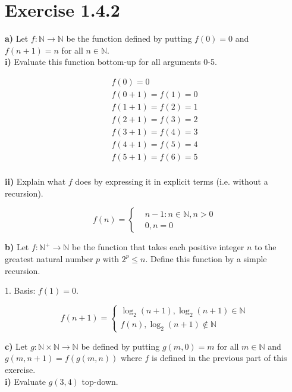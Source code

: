 \documentclass[titlepage, letterpaper, fleqn]{article}
\newcommand{\spacepls}{\vspace{5mm}}
\begin{document}
\section{Exercise 1.4.2}

{\large \textbf{a)} Let \(f \colon \mathbb{N} \to \mathbb{N}\) be the function defined by putting \(f(0) = 0\) and \(f(n+1) = n\) for all \(n \in \mathbb{N}\).}\\
\textbf{i)} Evaluate this function bottom-up for all arguments 0-5.


\begin{align*}
f(0) = 0\\
f(0+1) = f(1) = 0\\
f(1+1) = f(2) = 1\\
f(2+1) = f(3) = 2\\
f(3+1) = f(4) = 3\\
f(4+1) = f(5) = 4\\
f(5+1) = f(6) = 5\\
\end{align*}

\spacepls

\textbf{ii)} Explain what \(f\) does by expressing it in explicit terms (i.e. without a recursion).

\[f(n) =
\begin{cases}
& n -1 \colon n \in \mathbb{N}, n > 0 \\
& 0, n = 0
\end{cases}
\]

\pagebreak

{\large \textbf{b)} Let \(f \colon \mathbb{N}^+ \to \mathbb{N}\) be  the function that takes each positive integer \(n\) to the greatest natural number \(p\) with \(2^p \leq n\). Define this function by a simple recursion.}

1. Basis: \(f(1) = 0\).

\[f(n+1) =
\begin{cases}
\log_2 (n+1), \log_2 (n+1) \in \mathbb{N}\\
f(n), \log_2 (n+1) \not \in \mathbb{N}
\end{cases}
\]

{\large \textbf{c)} Let \(g \colon \mathbb{N} \times \mathbb{N} \to \mathbb{N}\) be defined by putting \(g(m,0) = m\) for all \(m \in \mathbb{N}\) and \(g(m,n+1) = f(g(m,n))\) where \(f\) is defined in the previous part of this exercise.}\\
\textbf{i)} Evaluate \(g(3,4)\) top-down.
\end{document}
